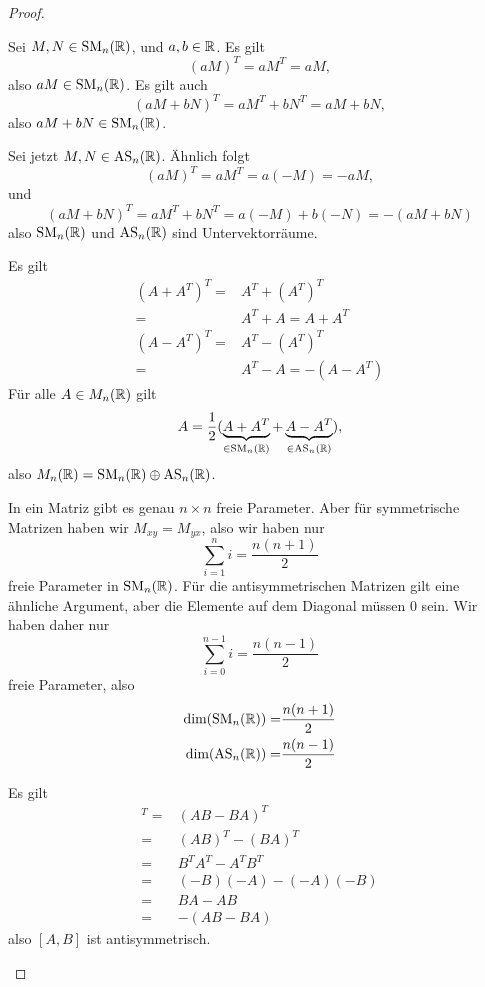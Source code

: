 \begin{proof}
	\begin{parts}
	\item Sei $M,N\in \text{SM}_n(\mathbb{R})$, und $a,b\in \mathbb{R}$. Es gilt
		\[
			(aM)^T=aM^T=aM
		,\]
		also $aM\in\text{SM}_n(\mathbb{R})$. Es gilt auch
		\[
			(aM+bN)^T=aM^T+bN^T=aM+bN
		,\]
		also $aM+bN\in\text{SM}_n(\mathbb{R})$.

		Sei jetzt $M,N\in\text{AS}_n(\mathbb{R})$. Ähnlich folgt
		\[
			(aM)^T=aM^T=a(-M)=-aM
		,\] 
		und
		\[
			(aM+bN)^T=aM^T+bN^T=a(-M)+b(-N)=-(aM+bN)
		\]
		also $\text{SM}_n(\mathbb{R})$ und $\text{AS}_n(\mathbb{R})$ sind Untervektorräume.
	\item Es gilt
		\begin{align*}
			(A+A^T)^T=&A^T+(A^T)^T\\
			=& A^T+A=A+A^T\\
			(A-A^T)^T=&A^T-(A^T)^T\\
			=&A^T-A=-(A-A^T)
		\end{align*}
		F\"{u}r alle $A\in M_n(\mathbb{R})$ gilt
		\[
			A=\frac{1}{2}(\underbrace{A+A^T}_{\in \text{SM}_n(\mathbb{R})}+\underbrace{A-A^T}_{\in\text{AS}_n(\mathbb{R})})
		,\] 
		also $M_n(\mathbb{R})=\text{SM}_n(\mathbb{R})\oplus \text{AS}_n(\mathbb{R})$. 
	\item In ein Matriz gibt es genau $n \times n$ freie Parameter. Aber f\"{u}r symmetrische Matrizen haben wir $M_{xy}=M_{yx}$, also wir haben nur
		\[
		\sum_{i=1}^{n} i=\frac{n(n+1)}{2}
		\]
		freie Parameter in $\text{SM}_n(\mathbb{R})$. F\"{u}r die antisymmetrischen Matrizen gilt eine ähnliche Argument, aber die Elemente auf dem Diagonal müssen $0$ sein. Wir haben daher nur
		\[
		\sum_{i=0}^{n-1} i=\frac{n(n-1)}{2}
		\]
		freie Parameter, also
		\begin{align*}
			\text{dim}(\text{SM}_n(\mathbb{R}))=&\frac{n(n+1)}{2}\\
			\text{dim}(\text{AS}_n(\mathbb{R}))=&\frac{n(n-1)}{2}
		\end{align*}
	\item Es gilt
		\begin{align*}
			[A,B]^T=&(AB-BA)^T\\
			=&(AB)^T-(BA)^T\\
			=&B^TA^T-A^TB^T\\
			=&(-B)(-A)-(-A)(-B)\\
			=&BA-AB\\
			=&-(AB-BA)
		\end{align*}
		also $[A,B]$ ist antisymmetrisch.\qedhere
	\end{parts}
\end{proof}
